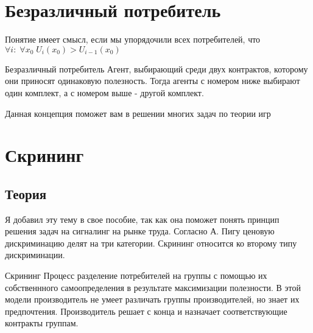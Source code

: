 \section{Безразличный потребитель}
Понятие имеет смысл, если мы упорядочили всех потребителей, что $\forall i : \;  \forall x_0\; U_i(x_0)>U_{i-1}(x_0)$
\begin{mybox}{Безразличный потребитель}
Агент, выбирающий среди двух контрактов, которому они приносят одинаковую полезность. Тогда агенты с номером ниже выбирают один комплект, а с номером выше - другой комплект.
\end{mybox}
\smallskip
Данная концепция поможет вам в решении многих задач по теории игр
\newpage
\section{Скрининг}
\subsection{Теория}
\indent\setlength{\parindent}{1em}Я добавил эту тему в свое пособие, так как она поможет понять принцип решения задач на сигналинг на рынке труда.
Согласно А. Пигу ценовую дискриминацию делят на три категории. Скрининг относится ко второму типу дискриминации.
\begin{mybox}{Скрининг}
Процесс разделение потребителей на группы с помощью их собственнного самоопределения в результате максимизации полезности. В этой модели производитель не умеет различать группы производителей, но знает их предпочтения. Производитель решает с конца и назначает соответствующие контракты группам.
\end{mybox}
